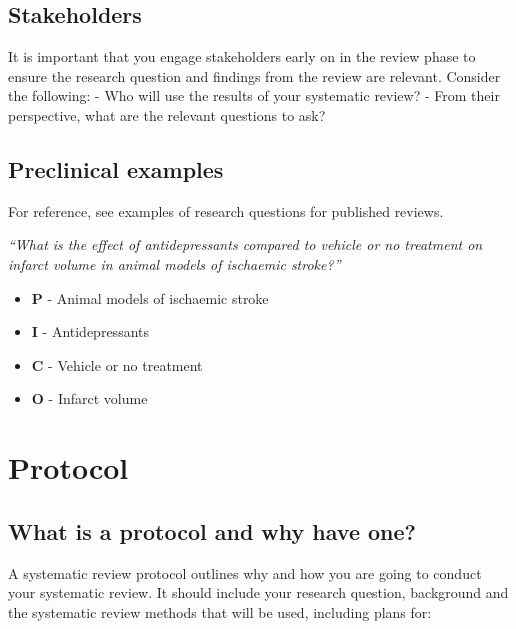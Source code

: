\documentclass[
]{book}
\providecommand{\tightlist}{%
  \setlength{\itemsep}{0pt}\setlength{\parskip}{0pt}}
\begin{document}
\hypertarget{stakeholders}{%
\section{Stakeholders}\label{stakeholders}}

It is important that you engage stakeholders early on in the review phase to ensure the research question and findings from the review are relevant. Consider the following:
- Who will use the results of your systematic review?
- From their perspective, what are the relevant questions to ask?

\hypertarget{preclinical-examples}{%
\section{Preclinical examples}\label{preclinical-examples}}

For reference, see examples of research questions for published reviews.

\emph{``What is the effect of antidepressants compared to vehicle or no treatment on infarct volume in animal models of ischaemic stroke?''}

\begin{itemize}
\tightlist
\item
  \textbf{P} - Animal models of ischaemic stroke\\
\item
  \textbf{I} - Antidepressants
\item
  \textbf{C} - Vehicle or no treatment
\item
  \textbf{O} - Infarct volume
\end{itemize}

\hypertarget{protocol}{%
\chapter{Protocol}\label{protocol}}

\hypertarget{what-is-a-protocol-and-why-have-one}{%
\section{What is a protocol and why have one?}\label{what-is-a-protocol-and-why-have-one}}

A systematic review protocol outlines why and how you are going to conduct your systematic review. It should include your research question, background and the systematic review methods that will be used, including plans for:
\end{document}
